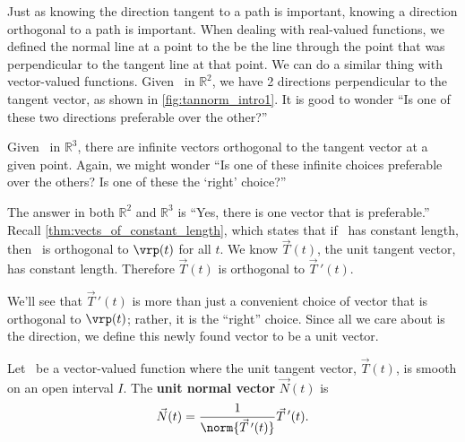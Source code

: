 Just as knowing the direction tangent to a path is important, knowing a direction orthogonal to a path is important. When dealing with real-valued functions, we defined the normal line at a point to the be the line through the point that was perpendicular to the tangent line at that point. We can do a similar thing with vector-valued functions. Given \vrt\ in $\mathbb{R}^2$, we have 2 directions perpendicular to the tangent vector, as shown in \autoref{fig:tannorm_intro1}. It is good to wonder ``Is one of these two directions preferable over the other?''

Given \vrt\ in $\mathbb{R}^3$,  there are infinite vectors orthogonal to the tangent vector at a given point. Again, we might wonder ``Is one of these infinite choices preferable over the others? Is one of these the `right' choice?''

The answer in both $\mathbb{R}^2$ and $\mathbb{R}^3$ is ``Yes, there is one vector that is preferable.'' %
Recall \autoref{thm:vects_of_constant_length}, which states that if \vrt\ has constant length, then \vrt\ is orthogonal to $\vrp(t)$ for all $t$. We know $\vec T(t)$, the unit tangent vector, has constant length. Therefore $\vec T(t)$ is orthogonal to $\vec T\,'(t)$.

We'll see that $\vec T\,'(t)$ is more than just a convenient choice of vector that is orthogonal to $\vrp(t)$; rather, it is the ``right'' choice. Since all we care about is the direction, we define this newly found vector to be a unit vector.


\begin{definition}\label{def:unit_normal}%
Let \vrt\ be a vector-valued function where the unit tangent vector, $\vec T(t)$, is smooth on an open interval $I$. The \textbf{unit normal vector} $\vec N(t)$ is
\[\vec N(t) = \frac1{\norm{\vec T\,'(t)}}\vec T\,'(t).\]
\end{definition}

